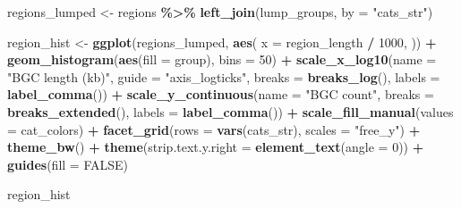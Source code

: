 \documentclass[
]{article}
\newenvironment{Shaded}{\begin{snugshade}}{\end{snugshade}}
\newcommand{\AttributeTok}[1]{\textcolor[rgb]{0.13,0.29,0.53}{#1}}
\newcommand{\ConstantTok}[1]{\textcolor[rgb]{0.56,0.35,0.01}{#1}}
\newcommand{\DecValTok}[1]{\textcolor[rgb]{0.00,0.00,0.81}{#1}}
\newcommand{\FunctionTok}[1]{\textcolor[rgb]{0.13,0.29,0.53}{\textbf{#1}}}
\newcommand{\NormalTok}[1]{#1}
\newcommand{\OtherTok}[1]{\textcolor[rgb]{0.56,0.35,0.01}{#1}}
\newcommand{\SpecialCharTok}[1]{\textcolor[rgb]{0.81,0.36,0.00}{\textbf{#1}}}
\newcommand{\StringTok}[1]{\textcolor[rgb]{0.31,0.60,0.02}{#1}}
\begin{document}
\begin{Shaded}
\begin{Highlighting}[]
\NormalTok{regions\_lumped }\OtherTok{\textless{}{-}}\NormalTok{ regions }\SpecialCharTok{\%\textgreater{}\%} \FunctionTok{left\_join}\NormalTok{(lump\_groups, }\AttributeTok{by =} \StringTok{"cats\_str"}\NormalTok{)}

\NormalTok{region\_hist }\OtherTok{\textless{}{-}} \FunctionTok{ggplot}\NormalTok{(regions\_lumped, }\FunctionTok{aes}\NormalTok{(}
  \AttributeTok{x =}\NormalTok{ region\_length }\SpecialCharTok{/} \DecValTok{1000}\NormalTok{,}
\NormalTok{)) }\SpecialCharTok{+}
  \FunctionTok{geom\_histogram}\NormalTok{(}\FunctionTok{aes}\NormalTok{(}\AttributeTok{fill =}\NormalTok{ group), }\AttributeTok{bins =} \DecValTok{50}\NormalTok{) }\SpecialCharTok{+}
  \FunctionTok{scale\_x\_log10}\NormalTok{(}\AttributeTok{name =} \StringTok{"BGC length (kb)"}\NormalTok{, }\AttributeTok{guide =} \StringTok{"axis\_logticks"}\NormalTok{, }\AttributeTok{breaks =} \FunctionTok{breaks\_log}\NormalTok{(), }\AttributeTok{labels =} \FunctionTok{label\_comma}\NormalTok{()) }\SpecialCharTok{+}
  \FunctionTok{scale\_y\_continuous}\NormalTok{(}\AttributeTok{name =} \StringTok{"BGC count"}\NormalTok{, }\AttributeTok{breaks =} \FunctionTok{breaks\_extended}\NormalTok{(), }\AttributeTok{labels =} \FunctionTok{label\_comma}\NormalTok{()) }\SpecialCharTok{+}
  \FunctionTok{scale\_fill\_manual}\NormalTok{(}\AttributeTok{values =}\NormalTok{ cat\_colors) }\SpecialCharTok{+}
  \FunctionTok{facet\_grid}\NormalTok{(}\AttributeTok{rows =} \FunctionTok{vars}\NormalTok{(cats\_str), }\AttributeTok{scales =} \StringTok{"free\_y"}\NormalTok{) }\SpecialCharTok{+}
  \FunctionTok{theme\_bw}\NormalTok{() }\SpecialCharTok{+}
  \FunctionTok{theme}\NormalTok{(}\AttributeTok{strip.text.y.right =} \FunctionTok{element\_text}\NormalTok{(}\AttributeTok{angle =} \DecValTok{0}\NormalTok{)) }\SpecialCharTok{+}
  \FunctionTok{guides}\NormalTok{(}\AttributeTok{fill =} \ConstantTok{FALSE}\NormalTok{)}

\NormalTok{region\_hist}
\end{Highlighting}
\end{Shaded}
\end{document}
